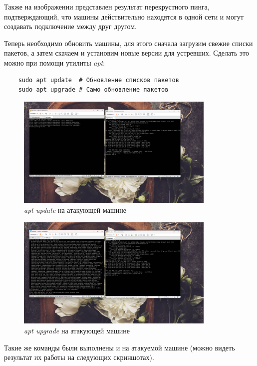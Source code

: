 \documentclass[a4paper]{article}
\begin{document}
  Также на изображении представлен результат перекрустного пинга,
  подтверждающий, что машины действительно находятся в одной сети
  и могут создавать подключение между друг другом.

  Теперь необходимо обновить машины, для этого сначала загрузим свежие
  списки пакетов, а затем скачаем и установим новые версии для устревших.
  Сделать это можно при помощи утилиты \textit{apt}:

  \begin{verbatim}
    sudo apt update  # Обновление списков пакетов
    sudo apt upgrade # Само обновление пакетов
  \end{verbatim}

  \begin{figure}[H]
    \centering
    \includegraphics[width=0.85\textwidth]{03_00 (30)}
    \caption{\textit{apt update} на атакующей машине}
    \label{img:30}
  \end{figure}

  \begin{figure}[H]
    \centering
    \includegraphics[width=0.85\textwidth]{03_00 (31)}
    \caption{\textit{apt upgrade} на атакующей машине}
    \label{img:31}
  \end{figure}

  Такие же команды были выполнены и на атакуемой машине (можно видеть результат
  их работы на следующих скриншотах).
\end{document}
